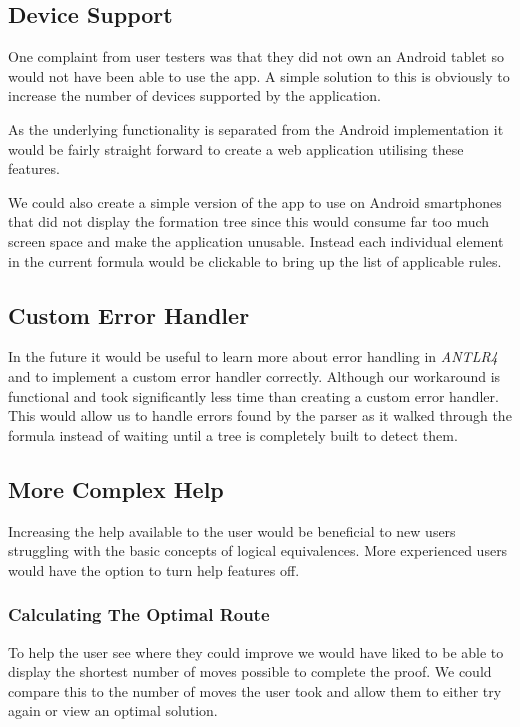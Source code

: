 \documentclass[draft]{report}
\begin{document}
\subsection{Device Support}

One complaint from user testers was that they did not own an Android tablet so would not have been able to use the app. A simple solution to this is obviously to increase the number of devices supported by the application. 

As the underlying functionality is separated from the Android implementation it would be fairly straight forward to create a web application utilising these features. 

We could also create a simple version of the app to use on Android smartphones that did not display the formation tree since this would consume far too much screen space and make the application unusable. Instead each individual element in the current formula would be clickable to bring up the list of applicable rules. 

\subsection{Custom Error Handler}

In the future it would be useful to learn more about error handling in \emph{ANTLR4} and to implement a custom error handler correctly. Although our workaround is functional and took significantly less time than creating a custom error handler. This would allow us to handle errors found by the parser as it walked through the formula instead of waiting until a tree is completely built to detect them. 

\subsection{More Complex Help}

Increasing the help available to the user would be beneficial to new users struggling with the basic concepts of logical equivalences. More experienced users would have the option to turn help features off.

\subsubsection{Calculating The Optimal Route}

To help the user see where they could improve we would have liked to be able to display the shortest number of moves possible to complete the proof. We could compare this to the number of moves the user took and allow them to either try again or view an optimal solution.
\end{document}
